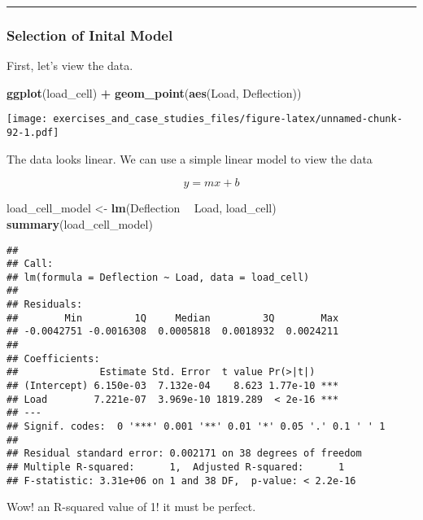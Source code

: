 \documentclass[]{book}
\newenvironment{Shaded}{\begin{snugshade}}{\end{snugshade}}
\newcommand{\KeywordTok}[1]{\textcolor[rgb]{0.13,0.29,0.53}{\textbf{#1}}}
\newcommand{\NormalTok}[1]{#1}
\newcommand{\OperatorTok}[1]{\textcolor[rgb]{0.81,0.36,0.00}{\textbf{#1}}}
\newcommand{\StringTok}[1]{\textcolor[rgb]{0.31,0.60,0.02}{#1}}
\theoremstyle{definition}
\theoremstyle{definition}
\theoremstyle{definition}
\theoremstyle{remark}
\begin{document}
\begin{center}\rule{0.5\linewidth}{\linethickness}\end{center}

\hypertarget{selection-of-inital-model}{%
\subsubsection{Selection of Inital
Model}\label{selection-of-inital-model}}

First, let's view the data.

\begin{Shaded}
\begin{Highlighting}[]
\KeywordTok{ggplot}\NormalTok{(load_cell) }\OperatorTok{+}
\StringTok{  }\KeywordTok{geom_point}\NormalTok{(}\KeywordTok{aes}\NormalTok{(Load, Deflection))}
\end{Highlighting}
\end{Shaded}

\texttt{[image: exercises\_and\_case\_studies\_files/figure-latex/unnamed-chunk-92-1.pdf]}

The data looks linear. We can use a simple linear model to view the data

\[ y = mx + b \]

\begin{Shaded}
\begin{Highlighting}[]
\NormalTok{load_cell_model <-}\StringTok{ }\KeywordTok{lm}\NormalTok{(Deflection }\OperatorTok{~}\StringTok{ }\NormalTok{Load, load_cell)}
\KeywordTok{summary}\NormalTok{(load_cell_model)}
\end{Highlighting}
\end{Shaded}

\begin{verbatim}
## 
## Call:
## lm(formula = Deflection ~ Load, data = load_cell)
## 
## Residuals:
##        Min         1Q     Median         3Q        Max 
## -0.0042751 -0.0016308  0.0005818  0.0018932  0.0024211 
## 
## Coefficients:
##              Estimate Std. Error  t value Pr(>|t|)    
## (Intercept) 6.150e-03  7.132e-04    8.623 1.77e-10 ***
## Load        7.221e-07  3.969e-10 1819.289  < 2e-16 ***
## ---
## Signif. codes:  0 '***' 0.001 '**' 0.01 '*' 0.05 '.' 0.1 ' ' 1
## 
## Residual standard error: 0.002171 on 38 degrees of freedom
## Multiple R-squared:      1,  Adjusted R-squared:      1 
## F-statistic: 3.31e+06 on 1 and 38 DF,  p-value: < 2.2e-16
\end{verbatim}

Wow! an R-squared value of 1! it must be perfect.
\end{document}
